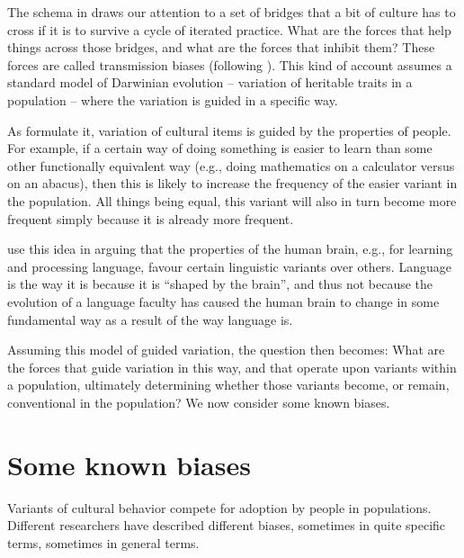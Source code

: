 The schema in  draws our attention to a set of bridges that a bit 
of culture has to cross if it is to survive a cycle of iterated 
practice. What are the forces that help things across those 
bridges, and what are the forces that inhibit them? These forces are 
called transmission biases (following \citealt{boyd_culture_1985,boyd_origin_2005}). 
This kind of account assumes a standard model of Darwinian 
evolution -- variation of heritable traits in a population -- where 
the variation is guided in a specific way. 



As \citet{boyd_culture_1985} formulate it, variation of cultural items 
is guided by the properties of people. For example, if a certain 
way of doing something is easier to learn than some other functionally 
equivalent way (e.g., doing mathematics on a calculator versus on an abacus), 
then this is likely to increase the frequency of the easier 
variant in the population. All things being equal, this variant 
will also in turn become more frequent simply because it is already 
more frequent. 



\citet{christiansen_language_2008} use this idea in arguing that the 
properties of the human brain, e.g., for learning and 
processing language, favour certain linguistic variants over others. Language is the way it is because it is ``shaped by the 
brain'', and thus not because the evolution of a language faculty has 
caused the human brain to change in some fundamental way as a result of 
the way language is. 



Assuming this model of guided variation, the question then becomes: What 
are the forces that guide variation in this way, and that 
operate upon variants within a population, ultimately 
determining whether those variants become, or remain, conventional in the 
population? We now consider some known biases.



\section{Some known biases}
\label{someknownbiases}

Variants of cultural behavior compete for adoption by people in populations. Different researchers have described different 
biases, sometimes in quite specific terms, sometimes in general terms. 



